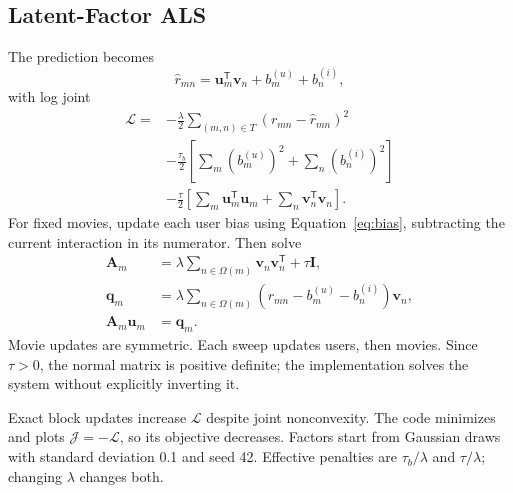 \subsection{Latent-Factor ALS}
The prediction becomes
\begin{equation}
\widehat r_{mn}=\mathbf{u}_m^{\mathsf T}\mathbf{v}_n+b_m^{(u)}+b_n^{(i)},
\label{eq:prediction}
\end{equation}
with log joint
\begin{align}
\mathcal L={}&-\frac{\lambda}{2}\sum_{(m,n)\in T}(r_{mn}-\widehat r_{mn})^2\nonumber\\
&-\frac{\tau_b}{2}\left[\sum_m(b_m^{(u)})^2+\sum_n(b_n^{(i)})^2\right]\nonumber\\
&-\frac{\tau}{2}\left[\sum_m\mathbf{u}_m^{\mathsf T}\mathbf{u}_m
+\sum_n\mathbf{v}_n^{\mathsf T}\mathbf{v}_n\right].
\label{eq:als}
\end{align}
For fixed movies, update each user bias using Equation~\ref{eq:bias}, subtracting the current interaction in its numerator. Then solve
\begin{align}
\mathbf A_m&=\lambda\sum_{n\in\Omega(m)}\mathbf v_n\mathbf v_n^{\mathsf T}+\tau\mathbf I,\nonumber\\
\mathbf q_m&=\lambda\sum_{n\in\Omega(m)}(r_{mn}-b_m^{(u)}-b_n^{(i)})\mathbf v_n,\nonumber\\
\mathbf A_m\mathbf u_m&=\mathbf q_m.
\label{eq:user-solve}
\end{align}
Movie updates are symmetric. Each sweep updates users, then movies. Since $\tau>0$, the normal matrix is positive definite; the implementation solves the system without explicitly inverting it.

Exact block updates increase $\mathcal L$ despite joint nonconvexity. The code minimizes and plots $\mathcal J=-\mathcal L$, so its objective decreases. Factors start from Gaussian draws with standard deviation 0.1 and seed 42. Effective penalties are $\tau_b/\lambda$ and $\tau/\lambda$; changing $\lambda$ changes both.

